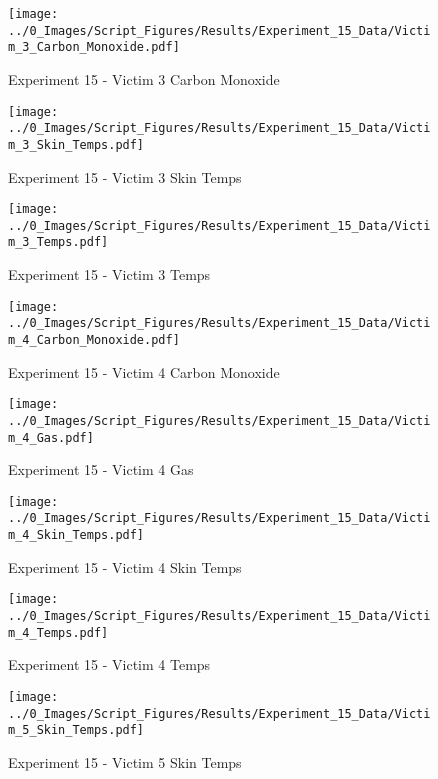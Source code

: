 	\clearpage

	\begin{figure}[H]
		\centering
		\texttt{[image: ../0\_Images/Script\_Figures/Results/Experiment\_15\_Data/Victim\_3\_Carbon\_Monoxide.pdf]}
		\caption[]{Experiment 15 - Victim 3 Carbon Monoxide}
	\end{figure}
 

	\begin{figure}[H]
		\centering
		\texttt{[image: ../0\_Images/Script\_Figures/Results/Experiment\_15\_Data/Victim\_3\_Skin\_Temps.pdf]}
		\caption[]{Experiment 15 - Victim 3 Skin Temps}
	\end{figure}
 
	\clearpage

	\begin{figure}[H]
		\centering
		\texttt{[image: ../0\_Images/Script\_Figures/Results/Experiment\_15\_Data/Victim\_3\_Temps.pdf]}
		\caption[]{Experiment 15 - Victim 3 Temps}
	\end{figure}
 

	\begin{figure}[H]
		\centering
		\texttt{[image: ../0\_Images/Script\_Figures/Results/Experiment\_15\_Data/Victim\_4\_Carbon\_Monoxide.pdf]}
		\caption[]{Experiment 15 - Victim 4 Carbon Monoxide}
	\end{figure}
 
	\clearpage

	\begin{figure}[H]
		\centering
		\texttt{[image: ../0\_Images/Script\_Figures/Results/Experiment\_15\_Data/Victim\_4\_Gas.pdf]}
		\caption[]{Experiment 15 - Victim 4 Gas}
	\end{figure}
 

	\begin{figure}[H]
		\centering
		\texttt{[image: ../0\_Images/Script\_Figures/Results/Experiment\_15\_Data/Victim\_4\_Skin\_Temps.pdf]}
		\caption[]{Experiment 15 - Victim 4 Skin Temps}
	\end{figure}
 
	\clearpage

	\begin{figure}[H]
		\centering
		\texttt{[image: ../0\_Images/Script\_Figures/Results/Experiment\_15\_Data/Victim\_4\_Temps.pdf]}
		\caption[]{Experiment 15 - Victim 4 Temps}
	\end{figure}
 

	\begin{figure}[H]
		\centering
		\texttt{[image: ../0\_Images/Script\_Figures/Results/Experiment\_15\_Data/Victim\_5\_Skin\_Temps.pdf]}
		\caption[]{Experiment 15 - Victim 5 Skin Temps}
	\end{figure}
 
